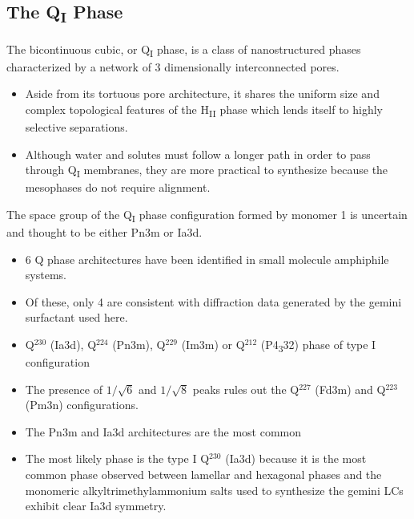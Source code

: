   \subsection{The Q\textsubscript{I} Phase}
  
  The bicontinuous cubic, or Q\textsubscript{I} phase, is a class 
  of nanostructured phases characterized by a network of 3 dimensionally
  interconnected pores.~\cite{hyde_bicontinuous_1996}
  \begin{itemize}
    \item Aside from its tortuous pore architecture, it shares the 
    uniform size and complex topological features of the H\textsubscript{II} phase
    which lends itself to highly selective separations.
    \item Although water and solutes must follow a longer path in order to pass
    through Q\textsubscript{I} membranes, they are more practical to synthesize
    because the mesophases do not require alignment.~\cite{zhou_new_2007}
  \end{itemize}
  
  The space group of the Q\textsubscript{I} phase configuration formed by
  monomer 1 is uncertain and thought to be either Pn3m or Ia3d.  %
  \begin{itemize}
    \item 6 Q phase architectures have been identified in small molecule
    amphiphile systems.~\cite{mariani_cubic_1988}
    \item Of these, only 4 are consistent with diffraction data generated
    by the gemini surfactant used here.~\cite{pindzola_cross-linked_2003}
    \item Q$^{230}$ (Ia3d), Q$^{224}$ (Pn3m), Q$^{229}$ (Im3m) or Q$^{212}$ (P4\textsubscript{3}32) phase of type I configuration
    \item The presence of $1 / \sqrt{6}$ and $1 / \sqrt{8}$ peaks rules out the
    Q$^{227}$ (Fd3m) and Q$^{223}$ (Pm3n) configurations.
    \item The Pn3m and Ia3d architectures are the most common~\cite{mariani_cubic_1988,wiesenauer_nanoporous_2012}
    \item The most likely phase is the type I Q$^{230}$ (Ia3d) because it is the
    most common phase observed between lamellar and hexagonal phases and the
    monomeric alkyltrimethylammonium salts used to synthesize the gemini LCs
    exhibit clear Ia3d symmetry.
  \end{itemize}


